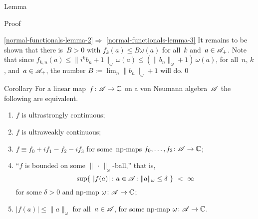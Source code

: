 \documentclass[a]{subfiles}
\begin{document}
\begin{parsec}
\begin{point}{Lemma}
\begin{point}{Proof}
\begin{point}{\ref{normal-functionals-lemma-2}$\Longrightarrow$%
\ref{normal-functionals-lemma-3}}
It remains to be shown that there is~$B>0$ with $f_k(a)\leq B\omega(a)$
for all~$k$ and~$a\in\mathscr{A}_{+}$.
Note that since $f_{k,n}(a) \leq \|i^kb_n+1\|_\omega \,\omega(a)
\leq (\|b_n\|_\omega+1) \,\omega(a)$,
for all~$n$, $k$, and~$a\in\mathscr{A}_{+}$,
the number $B:=\lim_n \|b_n\|_\omega +1 $ will do.\qed
\end{point}
\end{point}
\end{point}
\begin{point}[luws]{Corollary}%
For a linear map~$f\colon \mathscr{A}\to \mathbb{C}$
on a von Neumann algebra~$\mathscr{A}$ the following are equivalent.
\begin{enumerate}
\item
$f$ is ultrastrongly continuous;
\item
$f$ is ultraweakly continuous;
\item
$f\equiv f_0+if_1-f_2-if_3$
for some~np-maps $f_0,\dotsc,f_3\colon \mathscr{A}\to\mathbb{C}$;
\item
``$f$ is bounded on some $\|\,\cdot\,\|_\omega$-ball,''
that is,
\begin{equation*}
	\sup\{\ \left|f(a)\right|\colon a\in \mathscr{A}\colon 
		\|a\|_\omega\leq \delta\ \}\ <\ \infty
\end{equation*}
for some $\delta>0$ and  np-map $\omega\colon \mathscr{A}\to\mathbb{C}$;
\item
$\left|f(a)\right|\leq \|a\|_\omega$
for all~$a\in \mathscr{A}$, for some np-map $\omega\colon \mathscr{A}\to\mathbb{C}$.
\end{enumerate}
\end{point}
\end{parsec}
%
%
\end{document}
